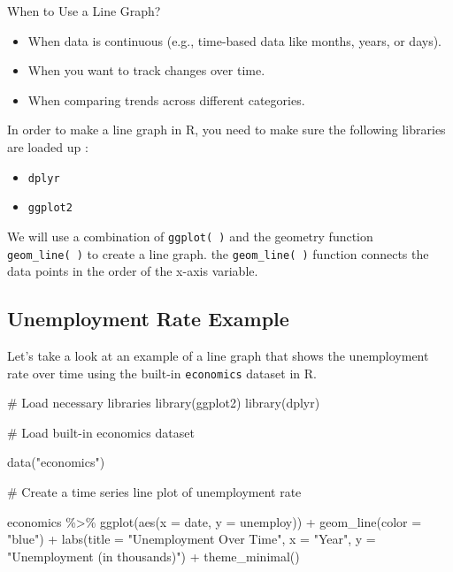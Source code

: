 \documentclass[
  letterpaper,
  DIV=11,
  numbers=noendperiod]{scrreprt}
\newenvironment{Shaded}{\begin{snugshade}}{\end{snugshade}}
\newcommand{\AttributeTok}[1]{\textcolor[rgb]{0.40,0.45,0.13}{#1}}
\newcommand{\CommentTok}[1]{\textcolor[rgb]{0.37,0.37,0.37}{#1}}
\newcommand{\FunctionTok}[1]{\textcolor[rgb]{0.28,0.35,0.67}{#1}}
\newcommand{\NormalTok}[1]{\textcolor[rgb]{0.00,0.23,0.31}{#1}}
\newcommand{\SpecialCharTok}[1]{\textcolor[rgb]{0.37,0.37,0.37}{#1}}
\newcommand{\StringTok}[1]{\textcolor[rgb]{0.13,0.47,0.30}{#1}}
\providecommand{\tightlist}{%
  \setlength{\itemsep}{0pt}\setlength{\parskip}{0pt}}\usepackage{longtable,booktabs,array}
\begin{document}
When to Use a Line Graph?

\begin{itemize}
\tightlist
\item
  When data is continuous (e.g., time-based data like months, years, or
  days).
\item
  When you want to track changes over time.
\item
  When comparing trends across different categories.
\end{itemize}

In order to make a line graph in R, you need to make sure the following
libraries are loaded up :

\begin{itemize}
\tightlist
\item
  \texttt{dplyr}
\item
  \texttt{ggplot2}
\end{itemize}

We will use a combination of \texttt{ggplot(\ )} and the geometry
function \texttt{geom\_line(\ )} to create a line graph. the
\texttt{geom\_line(\ )} function connects the data points in the order
of the x-axis variable.

\subsection*{Unemployment Rate Example}\label{unemployment-rate-example}

Let's take a look at an example of a line graph that shows the
unemployment rate over time using the built-in \texttt{economics}
dataset in R.

\begin{Shaded}
\begin{Highlighting}[]
\CommentTok{\# Load necessary libraries}
\FunctionTok{library}\NormalTok{(ggplot2)}
\FunctionTok{library}\NormalTok{(dplyr)}

\CommentTok{\# Load built{-}in economics dataset}

\FunctionTok{data}\NormalTok{(}\StringTok{"economics"}\NormalTok{)}

\CommentTok{\# Create a time series line plot of unemployment rate}

\NormalTok{economics }\SpecialCharTok{\%\textgreater{}\%}
  \FunctionTok{ggplot}\NormalTok{(}\FunctionTok{aes}\NormalTok{(}\AttributeTok{x =}\NormalTok{ date, }\AttributeTok{y =}\NormalTok{ unemploy)) }\SpecialCharTok{+}
  \FunctionTok{geom\_line}\NormalTok{(}\AttributeTok{color =} \StringTok{"blue"}\NormalTok{) }\SpecialCharTok{+}
  \FunctionTok{labs}\NormalTok{(}\AttributeTok{title =} \StringTok{"Unemployment Over Time"}\NormalTok{,}
       \AttributeTok{x =} \StringTok{"Year"}\NormalTok{,}
       \AttributeTok{y =} \StringTok{"Unemployment (in thousands)"}\NormalTok{) }\SpecialCharTok{+}
  \FunctionTok{theme\_minimal}\NormalTok{()}
\end{Highlighting}
\end{Shaded}
\end{document}
